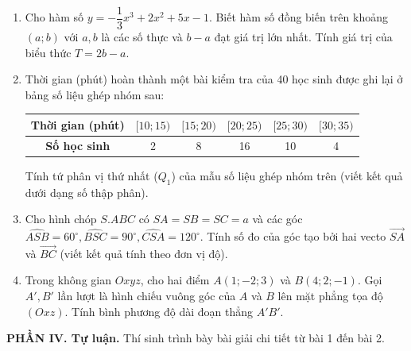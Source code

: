 \documentclass[12pt]{article}
\begin{document}
	\begin{enumerate}[label=\textbf{Câu \arabic*.}, leftmargin=*]
		
		\item Cho hàm số $y = -\dfrac{1}{3}x^3 + 2x^2 + 5x - 1$. Biết hàm số đồng biến trên khoảng $(a; b)$ với $a, b$ là các số thực và $b - a$ đạt giá trị lớn nhất. Tính giá trị của biểu thức $T = 2b - a$.
		
		\vspace{2mm}
		\item Thời gian (phút) hoàn thành một bài kiểm tra của 40 học sinh được ghi lại ở bảng số liệu ghép nhóm sau:
		\begin{center}
			\renewcommand{\arraystretch}{1.2}
			\begin{tabular}{|c|c|c|c|c|c|}
				\hline
				\textbf{Thời gian (phút)} & $[10; 15)$ & $[15; 20)$ & $[20; 25)$ & $[25; 30)$ & $[30; 35)$ \\
				\hline
				\textbf{Số học sinh} & 2 & 8 & 16 & 10 & 4 \\
				\hline
			\end{tabular}
		\end{center}
		Tính tứ phân vị thứ nhất ($Q_1$) của mẫu số liệu ghép nhóm trên (viết kết quả dưới dạng số thập phân).
		
		\vspace{2mm}
		\item Cho hình chóp $S.ABC$ có $SA = SB = SC = a$ và các góc $\widehat{ASB} = 60^\circ, \widehat{BSC} = 90^\circ, \widehat{CSA} = 120^\circ$. Tính số đo của góc tạo bởi hai vecto $\overrightarrow{SA}$ và $\overrightarrow{BC}$ (viết kết quả tính theo đơn vị độ).
		
		\vspace{2mm}
		\item Trong không gian $Oxyz$, cho hai điểm $A(1; -2; 3)$ và $B(4; 2; -1)$. Gọi $A', B'$ lần lượt là hình chiếu vuông góc của $A$ và $B$ lên mặt phẳng tọa độ $(Oxz)$. Tính bình phương độ dài đoạn thẳng $A'B'$.
		
	\end{enumerate}
	
	\vspace{4mm}
	\noindent\textbf{PHẦN IV. Tự luận.} Thí sinh trình bày bài giải chi tiết từ bài 1 đến bài 2.
	\vspace{2mm}
	
\end{document}
